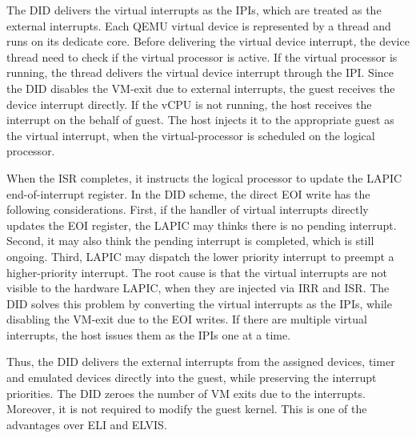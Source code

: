 {The DID delivers the virtual interrupts as the IPIs, which are
treated as the external interrupts. Each QEMU virtual device
is represented by a thread and runs on its dedicate core.
Before delivering the virtual device interrupt, the device
thread need to check if the virtual processor is active. If
the virtual processor is running, the thread delivers the
virtual device interrupt through the IPI. Since the DID
disables the VM-exit due to external interrupts, the guest
receives the device interrupt directly. If the vCPU is not
running, the host receives the interrupt on the behalf of
guest. The host injects it to the appropriate guest as the
virtual interrupt, when the virtual-processor is scheduled on
the logical processor.

When the ISR completes, it instructs the logical processor to
update the LAPIC end-of-interrupt register. In the DID scheme,
the direct EOI write has the following considerations. First,
if the handler of virtual interrupts directly updates the EOI
register, the LAPIC may thinks there is no pending interrupt.
Second, it may also think the pending interrupt is completed,
which is still ongoing. Third, LAPIC may dispatch the lower
priority interrupt to preempt a higher-priority interrupt. The
root cause is that the virtual interrupts are not visible to
the hardware LAPIC, when they are injected via IRR and ISR.
The DID solves this problem by converting the virtual
interrupts as the IPIs, while disabling the VM-exit due to the
EOI writes. If there are multiple virtual interrupts, the host
issues them as the IPIs one at a time.

Thus, the DID delivers the external interrupts from the
assigned devices, timer and emulated devices directly into the
guest, while preserving the interrupt priorities. The DID
zeroes the number of VM exits due to the interrupts. Moreover,
it is not required to modify the guest kernel. This is one of
the advantages over ELI and ELVIS.
}
